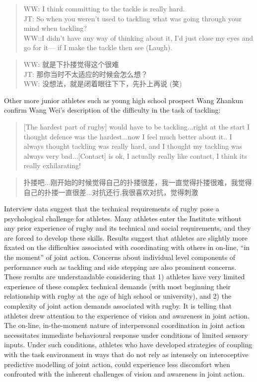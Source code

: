 \begin{CJK}{UTF8}{gbsn}
\begin{quote}
  WW: I think committing to the tackle is really hard. \\
  JT: So when you weren’t used to tackling what was going through your mind when tackling? \\
  WW::I didn’t have any way of thinking about it, I’d just close my eyes and go for it--- if I make the tackle then see (Laugh).
\end{quote}

\begin{quote}
  WW: 就是下扑搂觉得这个很难 \\
  JT: 那你当时不太适应的时候会怎么想？\\
  WW: 没想法，就是闭着眼往下下，先扑上再说 (笑)
\end{quote}


Other more junior athletes such as young high school prospect Wang Zhankun confirm Wang Wei's description of the difficulty in the task of tackling:

\begin{quote}
  [The hardest part of rugby] would have to be tackling...right at the start I thought defence was the hardest...now I feel much better about it.. I always thought tackling was really hard, and I thought my tackling was always very bad...[Contact] is ok, I actually really like contact, I think its really exhilarating!
\end{quote}

\begin{quote}
  扑搂吧...刚开始的时候觉得自己的扑搂很差，我一直觉得扑搂很难，我觉得自己的扑搂一直很差...对抗还行,我很喜欢对抗，觉得刺激
\end{quote}

Interview data suggest that the technical requirements of rugby pose a psychological challenge for athletes.  Many athletes enter the Institute without any prior experience of rugby and its technical and social requirements, and they are forced to develop these skills.  Results suggest that athletes are slightly more fixated on the difficulties associated with coordinating with others in on-line, ``in the moment'' of joint action.  Concerns about individual level components of performance such as tackling and side stepping are also prominent concerns.  These results are understandable considering that 1) athletes have very limited experience of these complex technical demands (with most beginning their relationship with rugby at the age of high school or university), and 2) the complexity of joint action demands associated with rugby.  It is telling that athletes drew attention to the experience of vision and awareness in joint action.  The on-line, in-the-moment nature of interpersonal coordination in joint action necessitates immediate behavioural response under conditions of limited sensory inputs.  Under such conditions, athletes who have developed strategies of coupling with the task environment in ways that do not rely as intensely on interoceptive predictive modelling of joint action, could experience less discomfort when confronted with the inherent challenges of vision and awareness in joint action.



\end{CJK}
